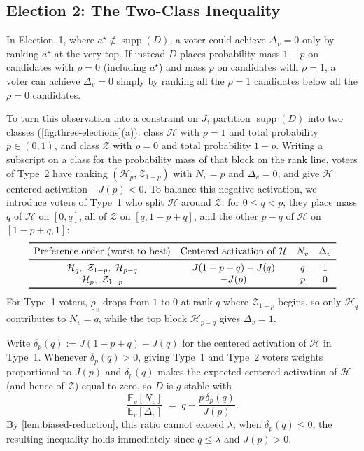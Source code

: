 \documentclass[11pt]{article}
\numberwithin{equation}{section}
\theoremstyle{plain}
\theoremstyle{definition}
\newcommand{\E}{\mathbb{E}}
\newcommand{\1}{\mathbf{1}}
\newcommand{\lowrho}{\underline{\rho}}
\newcommand{\supp}{\operatorname{supp}}
\newcommand{\calH}{\mathcal{H}}
\newcommand{\calZ}{\mathcal{Z}}
\begin{document}
\subsection{Election 2: The Two-Class Inequality}
\label{sec:election-2}

In Election~1, where $a^\star \notin \supp(D)$, a voter could achieve $\Delta_v = 0$ only by ranking $a^\star$ at the very top. If instead $D$ places probability mass $1 - p$ on candidates with $\rho = 0$ (including $a^\star$) and mass $p$ on candidates with $\rho = 1$, a voter can achieve $\Delta_v = 0$ simply by ranking all the $\rho = 1$ candidates below all the $\rho = 0$ candidates.

To turn this observation into a constraint on $J$, partition $\supp(D)$ into two classes (\cref{fig:three-elections}(a)): class $\calH$ with $\rho = 1$ and total probability $p \in (0, 1)$, and class $\calZ$ with $\rho = 0$ and total probability $1 - p$. Writing a subscript on a class for the probability mass of that block on the rank line, voters of Type~2 have ranking $(\calH_p, \calZ_{1-p})$ with $N_v = p$ and $\Delta_v = 0$, and give $\calH$ centered activation $-J(p) < 0$. To balance this negative activation, we introduce voters of Type~1 who split $\calH$ around $\calZ$: for $0 \le q < p$, they place mass $q$ of $\calH$ on $[0, q]$, all of $\calZ$ on $[q, 1 - p + q]$, and the other $p - q$ of $\calH$ on $[1 - p + q, 1]$:
\[
  \begin{array}{cccc}
    \toprule
    \text{Preference order (worst to best)} & \text{Centered activation of } \calH & N_v & \Delta_v \\
    \midrule
    \calH_q,\; \calZ_{1-p},\; \calH_{p-q} & J(1 - p + q) - J(q) & q & 1 \\
    \calH_p,\; \calZ_{1-p} & -J(p) & p & 0 \\
    \bottomrule
  \end{array}
\]
For Type~1 voters, $\lowrho_v$ drops from $1$ to $0$ at rank $q$ where $\calZ_{1-p}$ begins, so only $\calH_q$ contributes to $N_v = q$, while the top block $\calH_{p-q}$ gives $\Delta_v = 1$.

Write $\delta_p(q) := J(1 - p + q) - J(q)$ for the centered activation of $\calH$ in Type~1. Whenever $\delta_p(q) > 0$, giving Type~1 and Type~2 voters weights proportional to $J(p)$ and $\delta_p(q)$ makes the expected centered activation of $\calH$ (and hence of $\calZ$) equal to zero, so $D$ is $g$-stable with
\[
  \frac{\E_v[N_v]}{\E_v[\Delta_v]} \;=\; q + \frac{p\,\delta_p(q)}{J(p)}.
\]
By \cref{lem:biased-reduction}, this ratio cannot exceed $\lambda$; when $\delta_p(q) \le 0$, the resulting inequality holds immediately since $q \le \lambda$ and $J(p) > 0$.
\end{document}
